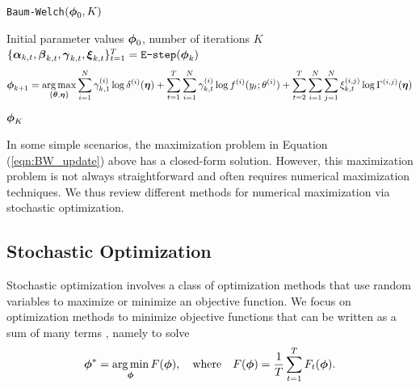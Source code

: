 %
%
%
\begin{algorithm}
\caption{\texttt{Baum-Welch}$(\boldsymbol{\phi}_0,K)$}\label{alg:EM}
\begin{algorithmic}[1]
\Require Initial parameter values $\boldsymbol{\phi}_0$, number of iterations $K$
    \State $\{\boldsymbol{\alpha}_{k,t},\boldsymbol{\beta}_{k,t},\boldsymbol{\gamma}_{k,t},\boldsymbol{\xi}_{k,t}\}_{t=1}^T = \texttt{E-step}(\boldsymbol{\phi}_{k})$  
    \State {} $$\boldsymbol{\phi}_{k+1} = \operatorname*{arg\,max}_{\{\boldsymbol{\theta},\boldsymbol{\eta}\}} \sum_{i=1}^N \gamma^{(i)}_{k,1} \log \delta^{(i)}(\boldsymbol{\eta}) + \sum_{t = 1}^T \sum_{i=1}^N \gamma^{(i)}_{k,t} \log f^{(i)}(y_t;\theta^{(i)}) + \sum_{t=2}^{T} \sum_{i=1}^N \sum_{j=1}^N \xi_{k,t}^{(i,j)} \log \Gamma^{(i,j)}(\boldsymbol{\eta})$$
\EndFor
\State \Return $\boldsymbol{\phi}_K$
\end{algorithmic}
\end{algorithm}
%
In some simple scenarios, the maximization problem in Equation (\ref{eqn:BW_update}) above has a closed-form solution. %
However, this maximization problem is not always straightforward and often requires numerical maximization techniques. %
We thus review different methods for numerical maximization via stochastic optimization. %

\subsection{Stochastic Optimization}
\label{subsec:stoch_optim}

Stochastic optimization involves a class of optimization methods that use random variables to maximize or minimize an objective function. We focus on optimization methods to minimize objective functions that can be written as a sum of many terms \citep{Robbins:1951}, %
namely to solve
%
\begin{equation}
    \boldsymbol{\phi}^* = \operatorname*{arg\,min}_{\boldsymbol{\phi}} F(\boldsymbol{\phi}), \quad \text{where} \quad F(\boldsymbol{\phi}) = \frac{1}{T}\sum_{t = 1}^T F_t(\boldsymbol{\phi}).
    \label{eqn:stoch_opt}
\end{equation}
%

